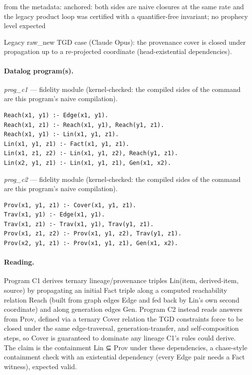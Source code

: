 \documentclass[10pt]{article}
\begin{document}
\begin{description}[leftmargin=2.6cm,style=nextline,itemsep=1pt]
\item[Obstruction note] from the metadata: anchored: both sides are naive closures at the same rate and the legacy product loop was certified with a quantifier-free invariant; no prophecy level expected

\item[Note] Legacy raw\_new TGD case (Claude Opus): the provenance cover is closed under propagation up to a re-projected coordinate (head-existential dependencies).

\end{description}

\paragraph{Datalog program(s).}

{\raggedright\textit{prog\_c1} --- fidelity module (kernel-checked: the compiled sides of the command are this program's naive compilation).\par}

\begin{Verbatim}[fontsize=\scriptsize,breaklines=true,breakanywhere=true,frame=single,framesep=1.5mm]
Reach(x1, y1) :- Edge(x1, y1).
Reach(x1, z1) :- Reach(x1, y1), Reach(y1, z1).
Reach(x1, y1) :- Lin(x1, y1, z1).
Lin(x1, y1, z1) :- Fact(x1, y1, z1).
Lin(x1, z1, z2) :- Lin(x1, y1, z2), Reach(y1, z1).
Lin(x2, y1, z1) :- Lin(x1, y1, z1), Gen(x1, x2).
\end{Verbatim}

{\raggedright\textit{prog\_c2} --- fidelity module (kernel-checked: the compiled sides of the command are this program's naive compilation).\par}

\begin{Verbatim}[fontsize=\scriptsize,breaklines=true,breakanywhere=true,frame=single,framesep=1.5mm]
Prov(x1, y1, z1) :- Cover(x1, y1, z1).
Trav(x1, y1) :- Edge(x1, y1).
Trav(x1, z1) :- Trav(x1, y1), Trav(y1, z1).
Prov(x1, z1, z2) :- Prov(x1, y1, z2), Trav(y1, z1).
Prov(x2, y1, z1) :- Prov(x1, y1, z1), Gen(x1, x2).
\end{Verbatim}

\paragraph{Reading.} Program C1 derives ternary lineage/provenance triples Lin(item, derived-item, source) by propagating an initial Fact triple along a computed reachability relation Reach (built from graph edges Edge and fed back by Lin's own second coordinate) and along generation edges Gen. Program C2 instead reads answers from Prov, defined via a ternary Cover relation the TGD constraints force to be closed under the same edge-traversal, generation-transfer, and self-composition steps, so Cover is guaranteed to dominate any lineage C1's rules could derive. The claim is the containment Lin ⊆ Prov under these dependencies, a chase-style containment check with an existential dependency (every Edge pair needs a Fact witness), expected valid.
\end{document}
